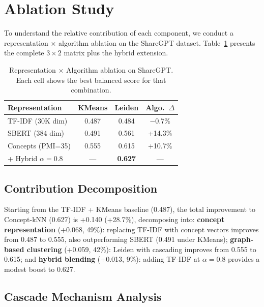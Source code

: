 \documentclass[conference]{IEEEtran}
\begin{document}
\section{Ablation Study}

To understand the relative contribution of each component, we conduct a representation $\times$ algorithm ablation on the ShareGPT dataset. Table~\ref{tab:ablation} presents the complete $3 \times 2$ matrix plus the hybrid extension.

\begin{table}[t]
\caption{Representation $\times$ Algorithm ablation on ShareGPT. Each cell shows the best balanced score for that combination.}
\label{tab:ablation}
\centering
\small
\begin{tabular}{@{}lccc@{}}
\toprule
\textbf{Representation} & \textbf{KMeans} & \textbf{Leiden} & \textbf{Algo.\ $\Delta$} \\
\midrule
TF-IDF (30K dim) & 0.487 & 0.484 & $-$0.7\% \\
SBERT (384 dim) & 0.491 & 0.561 & +14.3\% \\
Concepts (PMI=35) & 0.555 & 0.615 & +10.7\% \\
\midrule
+ Hybrid $\alpha\!=\!0.8$ & --- & \textbf{0.627} & --- \\
\bottomrule
\end{tabular}
\end{table}

\subsection{Contribution Decomposition}

Starting from the TF-IDF + KMeans baseline (0.487), the total improvement to Concept-kNN (0.627) is +0.140 (+28.7\%), decomposing into: \textbf{concept representation} (+0.068, 49\%): replacing TF-IDF with concept vectors improves from 0.487 to 0.555, also outperforming SBERT (0.491 under KMeans); \textbf{graph-based clustering} (+0.059, 42\%): Leiden with cascading improves from 0.555 to 0.615; and \textbf{hybrid blending} (+0.013, 9\%): adding TF-IDF at $\alpha\!=\!0.8$ provides a modest boost to 0.627.

\subsection{Cascade Mechanism Analysis}
\end{document}
